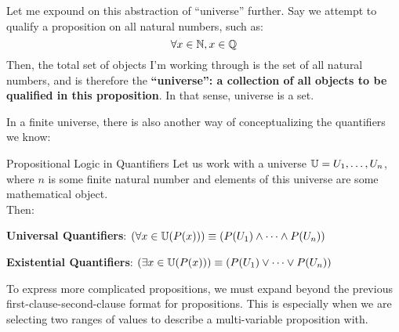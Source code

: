 Let me expound on this abstraction of ``universe'' further. Say we attempt to qualify a proposition on all natural numbers, such as:
\[
    \forall x \in \mathbb{N}, x \in \mathbb{Q}
\]
Then, the total set of objects I'm working through is the set of all natural numbers, and is therefore the \textbf{``universe'': a collection of all objects to be qualified in this proposition}.
In that sense, universe is a set.

In a finite universe, there is also another way of conceptualizing the quantifiers we know:
\begin{ln-think}{Propositional Logic in Quantifiers}{}
    Let us work with a universe $\mathbb{U} = {U_1, \dots, U_n}$, where $n$ is some finite natural number and elements of this universe are some mathematical object. \\
    Then:
    \begin{bindenum}
        \item \textbf{Universal Quantifiers}: $(\forall x \in \mathbb{U} (P(x))) \equiv (P(U_1) \land \dots \land P(U_n))$
        \item \textbf{Existential Quantifiers}: $(\exists x \in \mathbb{U} (P(x))) \equiv (P(U_1) \lor \dots \lor P(U_n))$
    \end{bindenum}
\end{ln-think}
To express more complicated propositions, we must expand beyond the previous first-clause-second-clause format for propositions. This is especially when we are selecting two ranges of values to describe a multi-variable proposition with.
